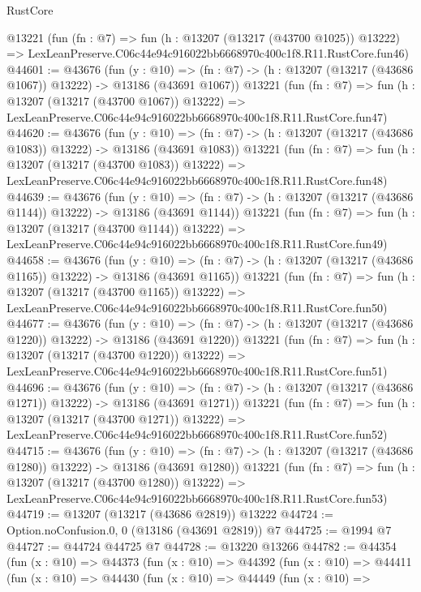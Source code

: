 \begin{lexlean}{RustCore}
\begin{coremodule}
    @13221
    (fun (fn : @7) =>
    fun (h : @13207 (@13217 (@43700 @1025)) @13222) =>
    LexLeanPreserve.C06c44e94c916022bb6668970c400c1f8.R11.RustCore.fun46)
@44601 := @43676
    (fun (y : @10) =>
    (fn : @7) -> (h : @13207 (@13217 (@43686 @1067)) @13222) -> @13186 (@43691 @1067))
    @13221
    (fun (fn : @7) =>
    fun (h : @13207 (@13217 (@43700 @1067)) @13222) =>
    LexLeanPreserve.C06c44e94c916022bb6668970c400c1f8.R11.RustCore.fun47)
@44620 := @43676
    (fun (y : @10) =>
    (fn : @7) -> (h : @13207 (@13217 (@43686 @1083)) @13222) -> @13186 (@43691 @1083))
    @13221
    (fun (fn : @7) =>
    fun (h : @13207 (@13217 (@43700 @1083)) @13222) =>
    LexLeanPreserve.C06c44e94c916022bb6668970c400c1f8.R11.RustCore.fun48)
@44639 := @43676
    (fun (y : @10) =>
    (fn : @7) -> (h : @13207 (@13217 (@43686 @1144)) @13222) -> @13186 (@43691 @1144))
    @13221
    (fun (fn : @7) =>
    fun (h : @13207 (@13217 (@43700 @1144)) @13222) =>
    LexLeanPreserve.C06c44e94c916022bb6668970c400c1f8.R11.RustCore.fun49)
@44658 := @43676
    (fun (y : @10) =>
    (fn : @7) -> (h : @13207 (@13217 (@43686 @1165)) @13222) -> @13186 (@43691 @1165))
    @13221
    (fun (fn : @7) =>
    fun (h : @13207 (@13217 (@43700 @1165)) @13222) =>
    LexLeanPreserve.C06c44e94c916022bb6668970c400c1f8.R11.RustCore.fun50)
@44677 := @43676
    (fun (y : @10) =>
    (fn : @7) -> (h : @13207 (@13217 (@43686 @1220)) @13222) -> @13186 (@43691 @1220))
    @13221
    (fun (fn : @7) =>
    fun (h : @13207 (@13217 (@43700 @1220)) @13222) =>
    LexLeanPreserve.C06c44e94c916022bb6668970c400c1f8.R11.RustCore.fun51)
@44696 := @43676
    (fun (y : @10) =>
    (fn : @7) -> (h : @13207 (@13217 (@43686 @1271)) @13222) -> @13186 (@43691 @1271))
    @13221
    (fun (fn : @7) =>
    fun (h : @13207 (@13217 (@43700 @1271)) @13222) =>
    LexLeanPreserve.C06c44e94c916022bb6668970c400c1f8.R11.RustCore.fun52)
@44715 := @43676
    (fun (y : @10) =>
    (fn : @7) -> (h : @13207 (@13217 (@43686 @1280)) @13222) -> @13186 (@43691 @1280))
    @13221
    (fun (fn : @7) =>
    fun (h : @13207 (@13217 (@43700 @1280)) @13222) =>
    LexLeanPreserve.C06c44e94c916022bb6668970c400c1f8.R11.RustCore.fun53)
@44719 := @13207 (@13217 (@43686 @2819)) @13222
@44724 := Option.noConfusion.{0, 0} (@13186 (@43691 @2819)) @7
@44725 := @1994 @7
@44727 := @44724 @44725 @7
@44728 := @13220 @13266
@44782 := @44354
    (fun (x : @10) =>
    @44373
      (fun (x : @10) =>
      @44392
        (fun (x : @10) =>
        @44411
          (fun (x : @10) =>
          @44430
            (fun (x : @10) =>
            @44449
              (fun (x : @10) =>

\end{coremodule}
\end{lexlean}
